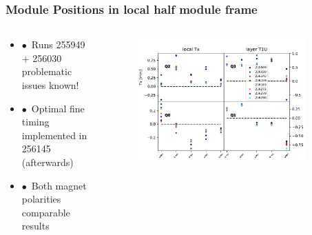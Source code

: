 \documentclass[aspectratio=1610, 12pt, xcolor=dvipsnames]{beamer}
\begin{document}
\begin{frame}\frametitle{Module Positions in local half module frame}
  \begin{columns}
    \begin{column}[c]{0.35\textwidth}
      \begin{itemize}
        \setlength\itemsep{0em}
        \item $\bullet$\, Runs 255949 + 256030 problematic \to issues known!
        \item $\bullet$\, Optimal fine timing implemented in 256145 (afterwards)
        \item $\bullet$\, Both magnet polarities comparable results
      \end{itemize}
    \end{column}
    \begin{column}[c]{0.65\textwidth}
      \begin{figure}
        \includegraphics[width=0.9\textwidth]{plots/plain_data/raw_data_T1U_Tx.pdf}
      \end{figure}
    \end{column}
  \end{columns}
\end{frame}
\end{document}
